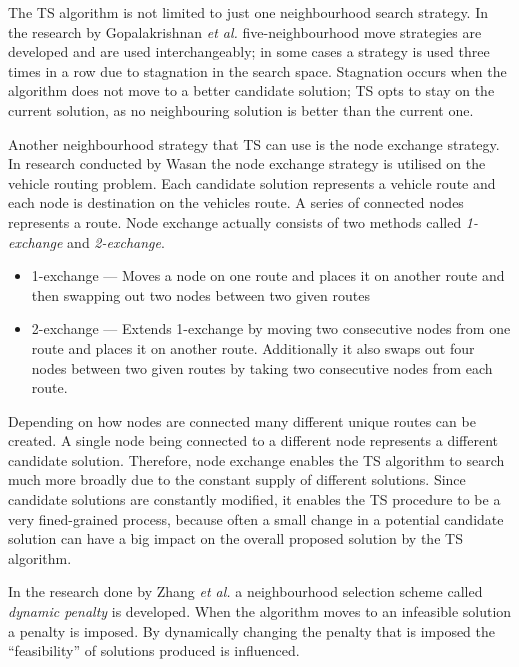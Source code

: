 The \gls{TS} algorithm is not limited to just one neighbourhood search strategy. In the research by Gopalakrishnan \emph{et al.}\cite{TabuCarryOver} five-neighbourhood move strategies are developed and are used interchangeably; in some cases a strategy is used three times in a row due to stagnation in the search space. Stagnation occurs when the algorithm does not move to a better candidate solution; \gls{TS} opts to stay on the current solution, as no neighbouring solution is better than the current one. 

Another neighbourhood strategy that \gls{TS} can use is the node exchange strategy. In research conducted by Wasan the node exchange strategy is utilised on the vehicle routing problem. Each candidate solution represents a vehicle route and each node is destination on the vehicles route. A series of connected nodes represents a route. Node exchange actually consists of two methods called \emph{1-exchange} and \emph{2-exchange}\cite{ReactiveTabuVHR}.
\begin{itemize}
\item{1-exchange} --- Moves a node on one route and places it on another route and then swapping out two nodes between two given routes\cite{ReactiveTabuVHR}
\item{2-exchange} --- Extends 1-exchange by moving two consecutive nodes from one route and places it on another route. Additionally it also swaps out four nodes between two given routes by taking two consecutive nodes from each route\cite{ReactiveTabuVHR}.
\end{itemize}

Depending on how nodes are connected many different unique routes can be created. A single node being connected to a different node represents a different candidate solution. Therefore, node exchange enables the \gls{TS} algorithm to search much more broadly due to the constant supply of different solutions. Since candidate solutions are constantly modified, it enables the \gls{TS} procedure to be a very fined-grained process, because often a small change in a potential candidate solution can have a big impact on the overall proposed solution by the \gls{TS} algorithm.

In the research done by Zhang \emph{et al.}\cite{TSHazardous} a neighbourhood selection scheme called \emph{dynamic penalty} is developed. When the algorithm moves to an infeasible solution a penalty is imposed. By dynamically changing the penalty that is imposed the ``feasibility'' of solutions produced is influenced. 

